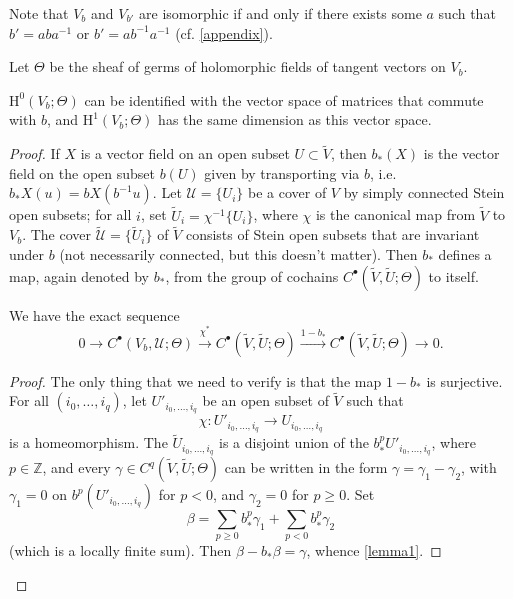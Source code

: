 \documentclass{article}
\theoremstyle{plain}
\newenvironment{proposition}[1]
    {\renewcommand\theinnercustomproposition{#1}\innercustomproposition}
    {\endinnercustomproposition}
\newenvironment{lemma}[1]
    {\renewcommand\theinnercustomlemma{#1}\innercustomlemma}
    {\endinnercustomlemma}
\theoremstyle{definition}
\newcommand{\ZZ}{\mathbb{Z}}
\newcommand{\HH}{\mathrm{H}}
\renewcommand{\geq}{\geqslant}
\newcommand{\oldpage}[1]{\marginpar{\footnotesize$\Big\vert$ \textit{p.~#1}}}
\begin{document}
Note that $V_b$ and $V_{b'}$ are isomorphic if and only if there exists some $a$ such that $b'=aba^{-1}$ or $b'=ab^{-1}a^{-1}$ (cf. \cref{appendix}).

Let $\Theta$ be the sheaf of germs of holomorphic fields of tangent vectors on $V_b$.

\begin{proposition}{2}
\label{proposition2}
  $\HH^0(V_b;\Theta)$ can be identified with the vector space of matrices that commute with $b$, and $\HH^1(V_b;\Theta)$ has the same dimension as this vector space.
\end{proposition}

\begin{proof}
  If $X$ is a vector field on an open subset $U\subset\widetilde{V}$, then $b_*(X)$ is the vector field on the open subset $b(U)$ given by transporting via $b$, i.e. $b_*X(u)=bX(b^{-1}u)$.
  Let $\mathscr{U}=\{U_i\}$ be a cover of $V$ by simply connected Stein open subsets;
  for all $i$, set $\widetilde{U}_i=\chi^{-1}\{U_i\}$, where $\chi$ is the canonical map from $\widetilde{V}$ to $V_b$.
  The cover $\widetilde{\mathscr{U}}=\{\widetilde{U}_i\}$ of $\widetilde{V}$ consists of Stein open subsets that are invariant under $b$ (not necessarily connected, but this doesn't matter).
  Then $b_*$ defines a map, again denoted by $b_*$, from the group of cochains $C^\bullet(\widetilde{V},\widetilde{U};\Theta)$ to itself.

  \begin{lemma}{1}
  \label{lemma1}
    We have the exact sequence
    \[
      0
      \to C^\bullet(V_b,\mathscr{U};\Theta)
      \xrightarrow{\chi^*} C^\bullet(\widetilde{V},\widetilde{U};\Theta)
      \xrightarrow{1-b_*} C^\bullet(\widetilde{V},\widetilde{U};\Theta)
      \to 0.
    \]
  \end{lemma}

  \begin{proof}
    The only thing that we need to verify is that the map $1-b_*$ is surjective.
    For all $(i_0,\ldots,i_q)$, let $U'_{i_0,\ldots,i_q}$ be an open subset of $\widetilde{V}$ such that
  \oldpage{3-05}
    \[
      \chi\colon U'_{i_0,\ldots,i_q} \to U_{i_0,\ldots,i_q}
    \]
    is a homeomorphism.
    The $\widetilde{U}_{i_0,\ldots,i_q}$ is a disjoint union of the $b_*^p U'_{i_0,\ldots,i_q}$, where $p\in\ZZ$, and every $\gamma\in C^q(\widetilde{V},\widetilde{U};\Theta)$ can be written in the form $\gamma=\gamma_1-\gamma_2$, with $\gamma_1=0$ on $b^p(U'_{i_0,\ldots,i_q})$ for $p<0$, and $\gamma_2=0$ for $p\geq0$.
    Set
    \[
      \beta = \sum_{p\geq0} b_*^p\gamma_1 + \sum_{p<0} b_*^p\gamma_2
    \]
    (which is a locally finite sum).
    Then $\beta-b_*\beta=\gamma$, whence \cref{lemma1}.
  \end{proof}


\end{proof}
\end{document}
